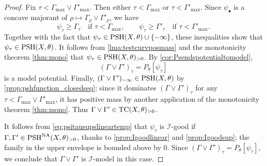 \begin{proof}
    Fix $\tau<\Gamma_{\max}\lor \Gamma'_{\max}$. Then either $\tau<\Gamma_{\max}$ or $\tau<\Gamma'_{\max}$. Since $\psi_\bullet$ is a concave majorant of $\rho\mapsto\Gamma_\rho\lor\Gamma'_\rho$, we have
    \[
    \psi_\tau\geq \Gamma_\tau
    \quad\text{if } \tau<\Gamma_{\max},
    \qquad
    \psi_\tau\geq \Gamma'_\tau
    \quad\text{if } \tau<\Gamma'_{\max}.
    \]
    Together with the fact that $\psi_\tau\in \mathrm{PSH}(X,\theta)\cup\{-\infty\}$, these inequalities show that $\psi_\tau\in \mathrm{PSH}(X,\theta)$. It follows from \cref{lma:testcurvposmass} and the monotonicity theorem \cref{thm:mono} that $\psi_\tau\in \mathrm{PSH}(X,\theta)_{>0}$. By \cref{cor:Psendspotentialtomodel},
    \[
        (\Gamma\lor\Gamma')_\tau=P_\theta[\psi_\tau]
    \]
    is a model potential. Finally, $(\Gamma\lor\Gamma')_{-\infty}\in \mathrm{PSH}(X,\theta)$ by \cref{prop:pshfunction_closedseq}; since it dominates $(\Gamma\lor\Gamma')_\tau$ for any $\tau<\Gamma_{\max}\lor\Gamma'_{\max}$, it has positive mass by another application of the monotonicity theorem \cref{thm:mono}. Thus $\Gamma\lor\Gamma'\in\mathrm{TC}(X,\theta)_{>0}$.

    It follows from \eqref{eq:psitausupslineartemp} that $\psi_{\tau}$ is $\mathcal{I}$-good if $\Gamma,\Gamma'\in \mathrm{PSH}^{\mathrm{NA}}(X,\theta)_{>0}$, thanks to \cref{prop:Igoodlinear} and \cref{prop:Igoodsup}; the family in the upper envelope is bounded above by $0$.
    Since $(\Gamma\lor\Gamma')_\tau=P_\theta[\psi_\tau]$, we conclude that $\Gamma\lor\Gamma'$ is $\mathcal{I}$-model in this case.
\end{proof}


